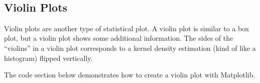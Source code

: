 \documentclass{book}
\begin{document}
    \begin{center}
    \end{center}
    { \hspace*{\fill} \\}
    

    
        \hypertarget{violin-plots}{%
\subsection{Violin Plots}\label{violin-plots}}
    




    
        Violin plots are another type of statistical plot. A violin plot is
similar to a box plot, but a violin plot shows some additional
information. The sides of the ``violins'' in a violin plot corresponds
to a kernel density estimation (kind of like a histogram) flipped
vertically.

The code section below demonstrates how to create a violin plot with
Matplotlib.
    
\end{document}
